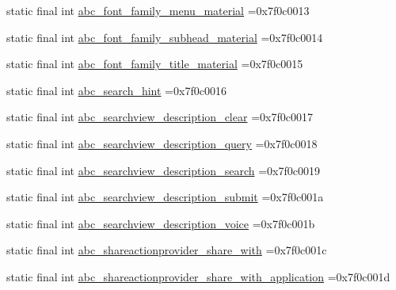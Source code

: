 \begin{DoxyCompactItemize}
\item 
static final int \mbox{\hyperlink{classbr_1_1unb_1_1cic_1_1mp_1_1marketmaster_1_1R_1_1string_a049a6816b06249c7924874e2b688d85f}{abc\+\_\+font\+\_\+family\+\_\+menu\+\_\+material}} =0x7f0c0013
\item 
static final int \mbox{\hyperlink{classbr_1_1unb_1_1cic_1_1mp_1_1marketmaster_1_1R_1_1string_af50f103ffef6027008e9234576e8a999}{abc\+\_\+font\+\_\+family\+\_\+subhead\+\_\+material}} =0x7f0c0014
\item 
static final int \mbox{\hyperlink{classbr_1_1unb_1_1cic_1_1mp_1_1marketmaster_1_1R_1_1string_a49e40dc6c4a3f86a5cc4acaa499790e3}{abc\+\_\+font\+\_\+family\+\_\+title\+\_\+material}} =0x7f0c0015
\item 
static final int \mbox{\hyperlink{classbr_1_1unb_1_1cic_1_1mp_1_1marketmaster_1_1R_1_1string_a3962fa5f02b742c0efceb2ebe303d2bc}{abc\+\_\+search\+\_\+hint}} =0x7f0c0016
\item 
static final int \mbox{\hyperlink{classbr_1_1unb_1_1cic_1_1mp_1_1marketmaster_1_1R_1_1string_ad992e2e4ecf1f9f1c8f06b91259d77a8}{abc\+\_\+searchview\+\_\+description\+\_\+clear}} =0x7f0c0017
\item 
static final int \mbox{\hyperlink{classbr_1_1unb_1_1cic_1_1mp_1_1marketmaster_1_1R_1_1string_af148793ab089b43acd3052ae1cbe7343}{abc\+\_\+searchview\+\_\+description\+\_\+query}} =0x7f0c0018
\item 
static final int \mbox{\hyperlink{classbr_1_1unb_1_1cic_1_1mp_1_1marketmaster_1_1R_1_1string_a4107f53073adaf4038790289bc1f9f18}{abc\+\_\+searchview\+\_\+description\+\_\+search}} =0x7f0c0019
\item 
static final int \mbox{\hyperlink{classbr_1_1unb_1_1cic_1_1mp_1_1marketmaster_1_1R_1_1string_af948fa127fdabcaefc60a407b7e58a34}{abc\+\_\+searchview\+\_\+description\+\_\+submit}} =0x7f0c001a
\item 
static final int \mbox{\hyperlink{classbr_1_1unb_1_1cic_1_1mp_1_1marketmaster_1_1R_1_1string_aae400e2cfd3c36d988e049b1ca357adf}{abc\+\_\+searchview\+\_\+description\+\_\+voice}} =0x7f0c001b
\item 
static final int \mbox{\hyperlink{classbr_1_1unb_1_1cic_1_1mp_1_1marketmaster_1_1R_1_1string_ae66a7788827031b18cff4c75733efd6b}{abc\+\_\+shareactionprovider\+\_\+share\+\_\+with}} =0x7f0c001c
\item 
static final int \mbox{\hyperlink{classbr_1_1unb_1_1cic_1_1mp_1_1marketmaster_1_1R_1_1string_a6bfce29f3fe4e6c0f404433a7bcf60de}{abc\+\_\+shareactionprovider\+\_\+share\+\_\+with\+\_\+application}} =0x7f0c001d

\end{DoxyCompactItemize}
